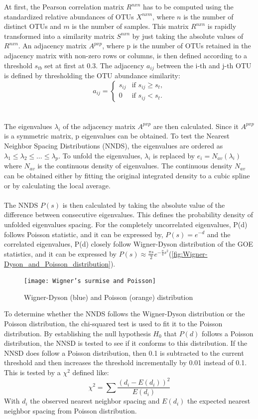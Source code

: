 At first, the Pearson correlation matrix $R^{nxn}$ has to be computed using the standardized relative abundances of OTUs $X^{nxm}$, where $n$ is the number of distinct OTUs and $m$ is the number of samples.
This matrix $R^{nxn}$ is rapidly transformed into a similarity matrix $S^{nxn}$ by just taking the absolute values of $R^{nxn}$.
An adjacency matrix $A^{pxp}$, where p is the number of OTUs retained in the adjacency matrix with non-zero rows or columns, is then defined according to a threshold $s_{tb}$ set at first at 0.3.
The adjacency $a_{ij}$ between the i-th and j-th OTU is defined by thresholding the OTU abundance similarity:
\[a_{ij} =
\begin{cases}
s_{ij} & \text{if } s_{ij} \geq s_t, \\
0 & \text{if } s_{ij} < s_t.
\end{cases}\]
\\\\
\noindent The eigenvalues $\lambda_i$ of the adjacency matrix $A^{pxp}$ are then calculated.
Since it $A^{pxp}$ is a symmetric matrix, p eigenvalues can be obtained.
To test the Nearest Neighbor Spacing Distributions (NNDS), the eigenvalues are ordered as $\lambda_1 \leq \lambda_2 \leq \ldots \leq \lambda_p$.
To unfold the eigenvalues, $\lambda_i$ is replaced by $e_i = N_{av}(\lambda_i)$ where $N_{av}$ is the continuous density of eigenvalues.
The continuous density $N_{av}$ can be obtained either by fitting the original integrated density to a cubic spline or by calculating the local average.
\\\\
The NNDS $P(s)$ is then calculated by taking the absolute value of the difference between consecutive eigenvalues.
This defines the probability density of unfolded eigenvalues spacing.
For the completely uncorrelated eigenvalues, P(d) follows Poisson statistic, and it can be expressed by, $P(s)=e^{-d}$ and the correlated eigenvalues, P(d) closely follow Wigner-Dyson distribution of the GOE statistics, and it can be expressed by $P(s) \approx \frac{\pi s}{2}e^{-\frac{\pi}{4}s^2}$(\autoref{fig:Wigner-Dyson_and_Poisson_distribution}).

\begin{figure}[H]
    \centering
    \texttt{[image: Wigner’s surmise and Poisson]} %
    \caption{Wigner-Dyson (blue) and Poisson (orange) distribution}
    \label{fig:Wigner-Dyson_and_Poisson_distribution}
\end{figure}

To determine whether the NNDS follows the Wigner-Dyson distribution or the Poisson distribution, the chi-squared test is used to fit it to the Poisson distribution.
By establishing the null hypothesis $H_0$ that $P(d)$ follows a Poisson distribution, the NNSD is tested to see if it conforms to this distribution.
If the NNSD does follow a Poisson distribution, then 0.1 is subtracted to the current threshold and then increases the threshold incrementally by 0.01 instead of 0.1.
This is tested by a $\chi^2$ defined like:
\[\chi^2=\sum \frac{(d_i-E(d_i))^2}{E(d_i)}\]
With $d_i$ the observed nearest neighbor spacing and $E(d_i)$ the expected nearest neighbor spacing from Poisson distribution.

